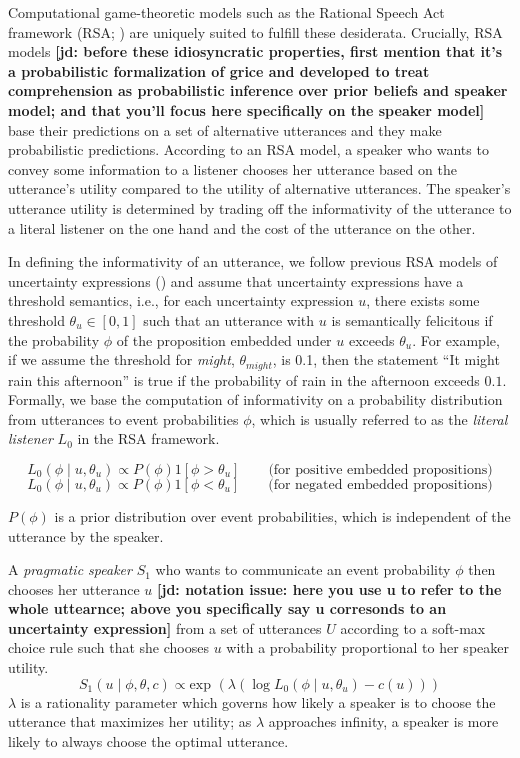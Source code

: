 \documentclass[lucida,biblatex]{sp} %
\renewcommand{\exp}{\text{exp }}
\newcommand{\jd}[1]{\textcolor{PinkyPurple}{\textbf{[jd: #1]}}}
\begin{document}
Computational game-theoretic models such as the Rational Speech Act 
framework (RSA; \cite{Goodman2016})  are uniquely suited to fulfill these desiderata.
Crucially, RSA models \jd{before these idiosyncratic properties, first mention that it's a probabilistic formalization of grice and developed to treat comprehension as probabilistic inference over prior beliefs and speaker model; and that you'll focus here specifically on the speaker model}  base their predictions on a set of alternative utterances and 
they make probabilistic predictions.  According to an RSA model, a speaker who wants to
 convey some information to a listener 
chooses her utterance based on the utterance's utility compared to the utility of alternative utterances. 
The speaker's utterance utility  is determined by trading off the informativity of the utterance to a literal listener on the one hand and the cost of the utterance on the other.

In defining the informativity of an utterance, we follow previous RSA models of uncertainty expressions (\cite{Lassiter2013,Herbstritt2019}) 
and assume that uncertainty expressions have a threshold semantics, 
i.e., for each uncertainty expression $u$, there exists some threshold $\theta_u \in [0,1]$ 
such that an utterance with $u$ is semantically felicitous if the probability $\phi$ 
of the proposition embedded under $u$ exceeds $\theta_u$. 
For example, if we assume the threshold for \textit{might}, $\theta_{might}$, is 0.1, then the statement 
``It might rain this afternoon'' is true if the probability of rain in the afternoon exceeds $0.1$. 
Formally, we base the computation of informativity on a probability distribution from utterances to event probabilities $\phi$, 
which is usually referred to as the \textit{literal listener} $L_0$ in the RSA framework. 

$$L_0\left(\phi \mid u, \theta_u\right) \propto P(\phi) 1\left[\phi > \theta_u \right] \qquad \mbox{(for positive embedded propositions)}$$
$$L_0\left(\phi \mid u, \theta_u\right) \propto P(\phi) 1\left[\phi < \theta_u \right] \qquad \mbox{(for negated embedded propositions)}$$ 

$P(\phi)$ is a prior distribution over event probabilities, which is independent of the utterance by the speaker.


A \textit{pragmatic speaker} $S_1$ who wants to communicate an event probability $\phi$ then chooses her utterance $u$ \jd{notation issue: here you use u to refer to the whole uttearnce; above you specifically say u corresonds to an uncertainty expression} from a set of utterances $U$ according to a soft-max choice rule \cite{Luce1959,SuttonBarto} such that she chooses $u$ with a probability proportional to her speaker utility. 
$$S_1\left(u \mid \phi, \theta, c\right) \propto \exp \left( \lambda \left( \log L_0\left(\phi \mid u, \theta_u\right)  - c(u)\right)\right)$$
$\lambda$ is a rationality parameter which governs how likely a speaker is to choose the utterance that maximizes her utility; as $\lambda$ approaches infinity, a speaker is more likely to always choose the optimal utterance.  
\end{document}

